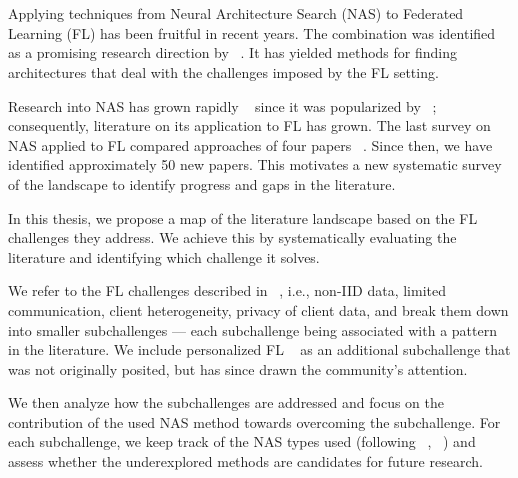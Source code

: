 \chapter{\abstractname}

Applying techniques from Neural Architecture Search (NAS) to Federated Learning (FL) has been fruitful in recent years. The combination was identified as a promising research direction by ~\cite{fl_advances_and_open_problems_2021}. It has yielded methods for finding architectures that deal with the challenges imposed by the FL setting.

Research into NAS has grown rapidly ~\cite{nas_1000_papers_2023} since it was popularized by ~\cite{nas_seminal_2017}; consequently, literature on its application to FL has grown. The last survey on NAS applied to FL compared approaches of four papers ~\cite{fl_to_nas_survey_2021}. Since then, we have identified approximately 50 new papers. This motivates a new systematic survey of the landscape to identify progress and gaps in the literature. 

In this thesis, we propose a map of the literature landscape based on the FL challenges they address. We achieve this by systematically evaluating the literature and identifying which challenge it solves. 

We refer to the FL challenges described in ~\cite{fl_seminal_2017}, i.e., non-IID data, limited communication, client heterogeneity, privacy of client data, and break them down into smaller subchallenges — each subchallenge being associated with a pattern in the literature. We include personalized FL ~\cite{personalized_fl_2023} as an additional subchallenge that was not originally posited, but has since drawn the community's attention. 

We then analyze how the subchallenges are addressed and focus on the contribution of the used NAS method towards overcoming the subchallenge. For each subchallenge, we keep track of the NAS types used (following ~\cite{nas_1000_papers_2023}, ~\cite{systematic_nas_survey_2024}) and assess whether the underexplored methods are candidates for future research.
